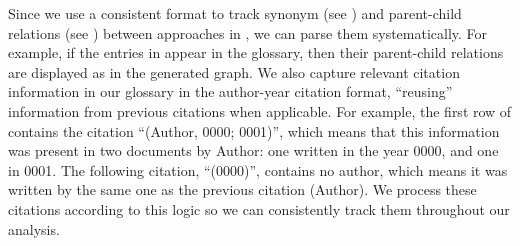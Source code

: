     Since we use a consistent format to track synonym
    (see ) and parent-child relations (see )
    between approaches in \ourApproachGlossary{}, we can parse them
    systematically. For example, if the entries in 
    appear in the glossary, then their parent-child relations are displayed as
     in the generated graph. We also capture relevant
    citation information in our glossary in the author-year citation format,
    ``reusing'' information from previous citations when applicable.
    For example, the first row of 
    contains the citation ``(Author, 0000; 0001)'', which means that this
    information was present in two documents by Author: one written in
    the year 0000, and one in 0001. The following citation, ``(0000)'',
    contains no author, which means it was written by the same one as the
    previous citation (Author). We process these citations according to this
    logic  so we can
    consistently track them throughout our analysis.

    

    \ExampleGraph{}

